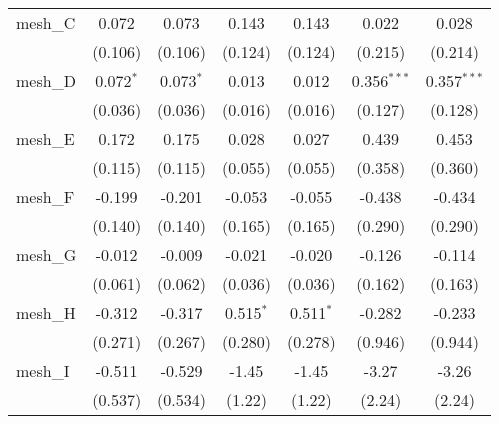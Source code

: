 \begin{tabular}{lcccccc}
   mesh\_C                                                     & 0.072          & 0.073         & 0.143         & 0.143         & 0.022         & 0.028\\   
                                                               & (0.106)        & (0.106)       & (0.124)       & (0.124)       & (0.215)       & (0.214)\\   
   mesh\_D                                                     & 0.072$^{*}$    & 0.073$^{*}$   & 0.013         & 0.012         & 0.356$^{***}$ & 0.357$^{***}$\\   
                                                               & (0.036)        & (0.036)       & (0.016)       & (0.016)       & (0.127)       & (0.128)\\   
   mesh\_E                                                     & 0.172          & 0.175         & 0.028         & 0.027         & 0.439         & 0.453\\   
                                                               & (0.115)        & (0.115)       & (0.055)       & (0.055)       & (0.358)       & (0.360)\\   
   mesh\_F                                                     & -0.199         & -0.201        & -0.053        & -0.055        & -0.438        & -0.434\\   
                                                               & (0.140)        & (0.140)       & (0.165)       & (0.165)       & (0.290)       & (0.290)\\   
   mesh\_G                                                     & -0.012         & -0.009        & -0.021        & -0.020        & -0.126        & -0.114\\   
                                                               & (0.061)        & (0.062)       & (0.036)       & (0.036)       & (0.162)       & (0.163)\\   
   mesh\_H                                                     & -0.312         & -0.317        & 0.515$^{*}$   & 0.511$^{*}$   & -0.282        & -0.233\\   
                                                               & (0.271)        & (0.267)       & (0.280)       & (0.278)       & (0.946)       & (0.944)\\   
   mesh\_I                                                     & -0.511         & -0.529        & -1.45         & -1.45         & -3.27         & -3.26\\   
                                                               & (0.537)        & (0.534)       & (1.22)        & (1.22)        & (2.24)        & (2.24)\\   

\end{tabular}
